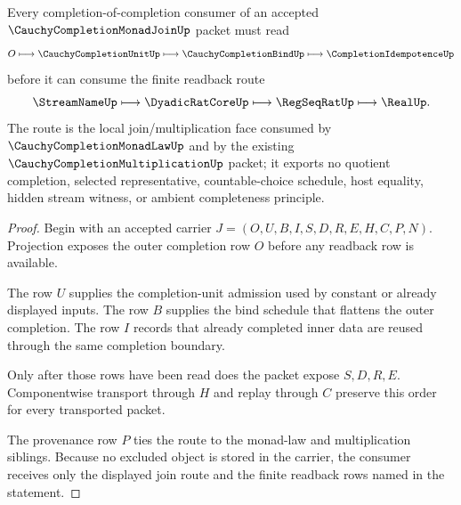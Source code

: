\begin{theorem}
\label{thm:cauchy-completion-monad-join-flattening-route}
Every completion-of-completion consumer of an accepted $\CauchyCompletionMonadJoinUp$ packet must read
$$
O \longmapsto \CauchyCompletionUnitUp \longmapsto \CauchyCompletionBindUp \longmapsto \CompletionIdempotenceUp
$$
before it can consume the finite readback route
$$
\StreamNameUp \longmapsto \DyadicRatCoreUp \longmapsto \RegSeqRatUp \longmapsto \RealUp .
$$
The route is the local join/multiplication face consumed by $\CauchyCompletionMonadLawUp$ and by the existing $\CauchyCompletionMultiplicationUp$ packet; it exports no quotient completion, selected representative, countable-choice schedule, host equality, hidden stream witness, or ambient completeness principle.
\end{theorem}
\begin{proof}
Begin with an accepted carrier $J=(O,U,B,I,S,D,R,E,H,C,P,N)$. Projection exposes the outer completion row $O$ before any readback row is available.

The row $U$ supplies the completion-unit admission used by constant or already displayed inputs. The row $B$ supplies the bind schedule that flattens the outer completion. The row $I$ records that already completed inner data are reused through the same completion boundary.

Only after those rows have been read does the packet expose $S,D,R,E$. Componentwise transport through $H$ and replay through $C$ preserve this order for every transported packet.

The provenance row $P$ ties the route to the monad-law and multiplication siblings. Because no excluded object is stored in the carrier, the consumer receives only the displayed join route and the finite readback rows named in the statement.
\end{proof}



